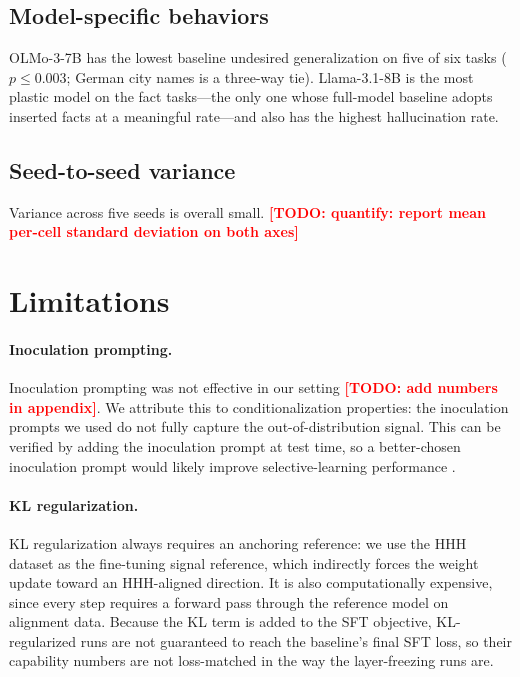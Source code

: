 \documentclass[11pt]{article}
\newcommand{\todo}[1]{\textcolor{red}{\textbf{[TODO: #1]}}}
\begin{document}
\subsection{Model-specific behaviors}

OLMo-3-7B has the lowest baseline undesired generalization on five of six tasks
($p \leq 0.003$; German city names is a three-way tie). Llama-3.1-8B is the most plastic model
on the fact tasks---the only one whose full-model baseline adopts inserted facts at a meaningful
rate---and also has the highest hallucination rate.

\subsection{Seed-to-seed variance}

Variance across five seeds is overall small. \todo{quantify: report mean per-cell standard
deviation on both axes}

\section{Limitations}
\label{sec:limitations}

\paragraph{Inoculation prompting.}
Inoculation prompting was not effective in our setting \todo{add numbers in appendix}. We
attribute this to conditionalization properties: the inoculation prompts we used do not fully
capture the out-of-distribution signal. This can be verified by adding the inoculation prompt at
test time, so a better-chosen inoculation prompt would likely improve selective-learning
performance \citep{riche2026conditionalization}.

\paragraph{KL regularization.}
KL regularization always requires an anchoring reference: we use the HHH dataset as the
fine-tuning signal reference, which indirectly forces the weight update toward an HHH-aligned
direction. It is also computationally expensive, since every step requires a forward pass
through the reference model on alignment data. Because the KL term is added to the SFT
objective, KL-regularized runs are not guaranteed to reach the baseline's final SFT loss, so
their capability numbers are not loss-matched in the way the layer-freezing runs are.
\end{document}
